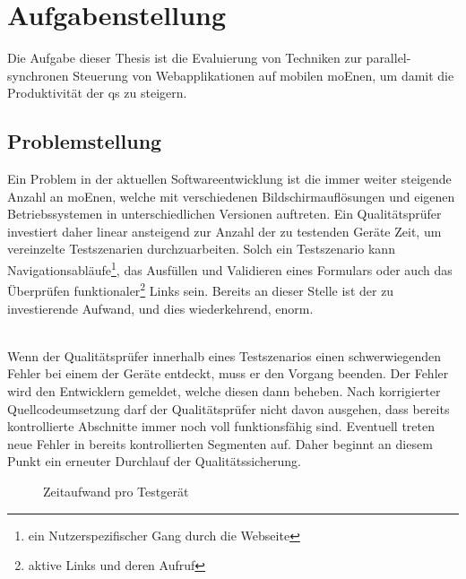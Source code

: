 \chapter{Aufgabenstellung}

Die Aufgabe dieser Thesis ist die Evaluierung von Techniken zur \gls{parallel-synchron}en Steuerung von Webapplikationen auf mobilen \Gls{moEn}en, um damit die Produktivität der \Gls{qs} zu steigern.
	\section{Problemstellung}
	Ein Problem in der aktuellen Softwareentwicklung ist die immer weiter steigende Anzahl an \Gls{moEn}en, welche mit 			verschiedenen Bildschirmauflösungen und eigenen Betriebssystemen in unterschiedlichen Versionen auftreten. Ein Qualitätsprüfer investiert daher linear ansteigend zur Anzahl der zu testenden Geräte Zeit, um vereinzelte Testszenarien durchzuarbeiten. Solch ein Testszenario kann Navigationsabläufe\footnote{ein Nutzerspezifischer Gang durch die Webseite}, das Ausfüllen und Validieren eines Formulars oder auch das Überprüfen funktionaler\footnote{aktive Links und deren Aufruf} Links sein. Bereits an dieser Stelle ist der zu investierende Aufwand, und dies wiederkehrend, enorm.
	
	\\Wenn der Qualitätsprüfer innerhalb eines Testszenarios einen schwerwiegenden Fehler bei einem der Geräte entdeckt, muss 		er den Vorgang beenden. Der Fehler wird den Entwicklern gemeldet, welche diesen dann beheben. Nach korrigierter Quellcodeumsetzung darf der Qualitätsprüfer nicht 	davon ausgehen, dass bereits kontrollierte Abschnitte immer noch voll funktionsfähig sind. Eventuell treten neue Fehler in bereits kontrollierten Segmenten auf. Daher beginnt an diesem Punkt ein erneuter Durchlauf der Qualitätssicherung.
	
	\begin{figure}[H]
	\centering

	\caption[Zeitaufwand pro Testgerät]{Zeitaufwand pro Testgerät}
\end{figure}
\vspace{-40pt}

